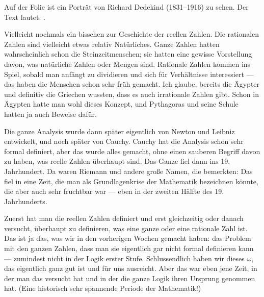 \begin{meta-note}
Auf der Folie ist ein Porträt von Richard Dedekind (1831--1916) zu sehen. Der Text lautet: .
\end{meta-note}

\begin{spoken-clean}[00:11:09 - 00:13:35]
Vielleicht nochmals ein bisschen zur Geschichte der reellen Zahlen. Die rationalen Zahlen sind vielleicht etwas relativ Natürliches. Ganze Zahlen hatten wahrscheinlich schon die Steinzeitmenschen; sie hatten eine gewisse Vorstellung davon, was natürliche Zahlen oder Mengen sind. Rationale Zahlen kommen ins Spiel, sobald man anfängt zu dividieren und sich für Verhältnisse interessiert --- das haben die Menschen schon sehr früh gemacht. Ich glaube, bereits die Ägypter und definitiv die Griechen wussten, dass es auch irrationale Zahlen gibt. Schon in Ägypten hatte man wohl dieses Konzept, und Pythagoras und seine Schule hatten ja auch Beweise dafür.

Die ganze Analysis wurde dann später eigentlich von Newton und Leibniz entwickelt, und noch später von Cauchy. Cauchy hat die Analysis schon sehr formal definiert, aber das wurde alles gemacht, ohne einen sauberen Begriff davon zu haben, was reelle Zahlen überhaupt sind. Das Ganze fiel dann ins 19. Jahrhundert. Da waren Riemann und andere große Namen, die bemerkten:  Das fiel in eine Zeit, die man als Grundlagenkrise der Mathematik bezeichnen könnte, die aber auch sehr fruchtbar war --- eben in der zweiten Hälfte des 19. Jahrhunderts.

Zuerst hat man die reellen Zahlen definiert und erst gleichzeitig oder danach versucht, überhaupt zu definieren, was eine ganze oder eine rationale Zahl ist. Das ist ja das, was wir in den vorherigen Wochen gemacht haben: das Problem mit den ganzen Zahlen, dass man sie eigentlich gar nicht formal definieren kann --- zumindest nicht in der Logik erster Stufe.  Schlussendlich haben wir dieses $\omega$, das eigentlich ganz gut ist und für uns ausreicht. Aber das war eben jene Zeit, in der man das versucht hat und in der die ganze Logik ihren Ursprung genommen hat. (Eine historisch sehr spannende Periode der Mathematik!)
\end{spoken-clean}

